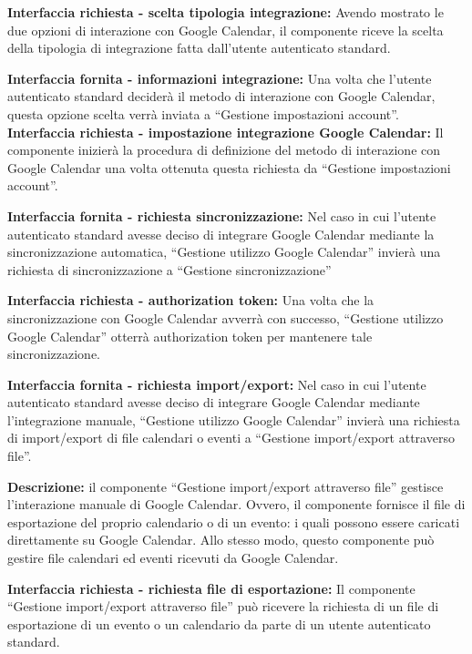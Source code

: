 \begin{listaPersonale}[]{}
    \textbf{Interfaccia richiesta - scelta tipologia integrazione:} Avendo mostrato le due opzioni di interazione con Google Calendar, il componente riceve la scelta della tipologia di integrazione fatta dall'utente autenticato standard.

    \textbf{Interfaccia fornita - informazioni integrazione:} Una volta che l'utente autenticato standard deciderà il metodo di interazione con Google Calendar, questa opzione scelta verrà inviata a “Gestione impostazioni account”.
    \textbf{Interfaccia richiesta - impostazione integrazione Google
        Calendar:} Il componente inizierà la procedura di definizione del metodo di interazione con Google Calendar una volta ottenuta questa richiesta da “Gestione impostazioni account”.

    \textbf{Interfaccia fornita - richiesta sincronizzazione:} Nel caso in cui l'utente autenticato standard avesse deciso di integrare Google Calendar mediante la sincronizzazione automatica, “Gestione utilizzo Google Calendar” invierà una richiesta di sincronizzazione a “Gestione sincronizzazione”

    \textbf{Interfaccia richiesta - authorization token:} Una volta che la sincronizzazione con Google Calendar avverrà con successo, “Gestione utilizzo Google Calendar” otterrà authorization token per mantenere tale sincronizzazione.

    \textbf{Interfaccia fornita - richiesta import/export:}  Nel caso in cui l'utente autenticato standard avesse deciso di integrare Google Calendar mediante l'integrazione manuale, “Gestione utilizzo Google Calendar” invierà una richiesta di import/export di file calendari o eventi a “Gestione import/export attraverso file”.



    \textbf{Descrizione:} il componente “Gestione import/export attraverso file” gestisce l'interazione manuale di Google Calendar. Ovvero, il componente fornisce il file di esportazione del proprio calendario o di un evento: i quali possono essere caricati direttamente su Google Calendar. Allo stesso modo, questo componente può gestire file calendari ed eventi ricevuti da Google Calendar.

    \textbf{Interfaccia richiesta - richiesta file di esportazione:} Il componente “Gestione import/export attraverso file” può ricevere la richiesta di un file di esportazione di un evento o un calendario da parte di un utente autenticato standard.


\end{listaPersonale}
